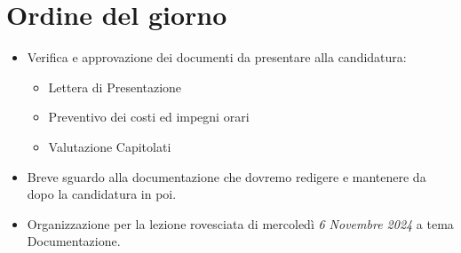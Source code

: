 \section{Ordine del giorno}

\begin{itemize}
    \item Verifica e approvazione dei documenti da presentare alla candidatura:
    \begin{itemize}
        \renewcommand{\labelitemii}{--}
        \item Lettera di Presentazione
        \item Preventivo dei costi ed impegni orari
        \item Valutazione Capitolati
    \end{itemize}
    \item Breve sguardo alla documentazione che dovremo redigere e mantenere da dopo la candidatura in poi.
    \item Organizzazione per la lezione rovesciata di mercoledì \emph{6 Novembre 2024} a tema Documentazione.
\end{itemize}